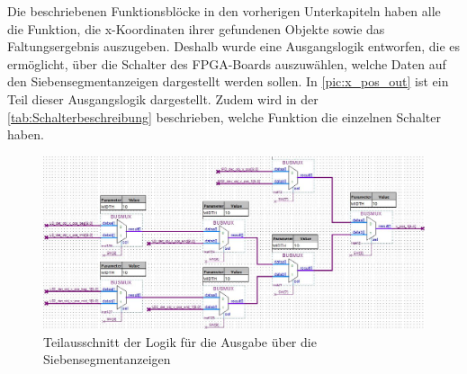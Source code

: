 \documentclass[ngerman,12pt]{article} %
\begin{document}
{Die beschriebenen Funktionsblöcke in den vorherigen Unterkapiteln haben alle die Funktion, die x-Koordinaten ihrer gefundenen Objekte sowie das Faltungsergebnis auszugeben. Deshalb wurde eine Ausgangslogik entworfen, die es ermöglicht, über die Schalter des FPGA-Boards auszuwählen, welche Daten auf den Siebensegmentanzeigen dargestellt werden sollen. In \autoref{pic:x_pos_out} ist ein Teil dieser Ausgangslogik dargestellt. Zudem wird in der \autoref{tab:Schalterbeschreibung} beschrieben, welche Funktion die einzelnen Schalter haben.\newline

\begin{figure}[htbp]
	\begin{center}
	\includegraphics[width =\textwidth]{x_pos_out_bearbeitet}
	\caption[Teilausschnitt der Logik für die Ausgabe über die Siebensegmentanzeigen]{\label{pic:x_pos_out}Teilausschnitt der Logik für die Ausgabe über die Siebensegmentanzeigen}
	\end{center}
\end{figure}

}
\end{document}
